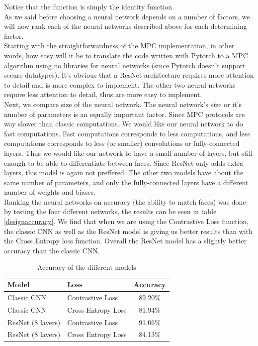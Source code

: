 Notice that the  function is simply the identity function.\\

As we said before choosing a neural network depends on a number of factors, we will now rank each of the neural networks described above for each determining factor.\\

Starting with the straightforwardness of the MPC implementation, in other words, how easy will it be to translate the code written with Pytorch to a MPC algorithm using no libraries for neural networks (since Pytorch doesn't support secure datatypes). It's obvious that a ResNet architecture requires more attention to detail and is more complex to implement. The other two neural networks require less attention to detail, thus are more easy to implement.\\

Next, we compare size of the neural network. The neural network's size or it's number of parameters is an equally important factor. Since MPC protocols are way slower than classic computations. We would like our neural network to do fast computations. Fast computations corresponds to less computations, and less computations corresponds to less (or smaller) convolutions or fully-connected layers. Thus we would like our network to have a small number of layers, but still enough to be able to differentiate between faces. Since ResNet only adds extra layers, this model is again not preffered. The other two models have about the same number of parameters, and only the fully-connected layers have a different number of weights and biases.\\

Ranking the neural networks on accuracy (the ability to match faces) was done by testing the four different networks, the results can be seen in table \ref{designaccuracy}. We find that when we are using the Contrastive Loss function, the classic CNN as well as the ResNet model is giving us better results than with the Cross Entropy loss function. Overall the ResNet model has a slightly better accuracy than the classic CNN.

\begin{table}[]
\begin{tabular}{llc}
\hline
\multicolumn{1}{|l|}{Model} & \multicolumn{1}{l|}{Loss} & \multicolumn{1}{l|}{Accuracy} \\ \hline
Classic CNN                 & Contrastive Loss          & 89.20\%                       \\
Classic CNN                 & Cross Entropy Loss        & 81.94\%                       \\
ResNet (8 layers)           & Contrastive Loss          & 91.06\%                       \\
ResNet (8 layers)           & Cross Entropy Loss        & 84.13\%
\end{tabular}
\caption{Accuracy of the different models}
\label{table:designaccuracy}
\end{table}

